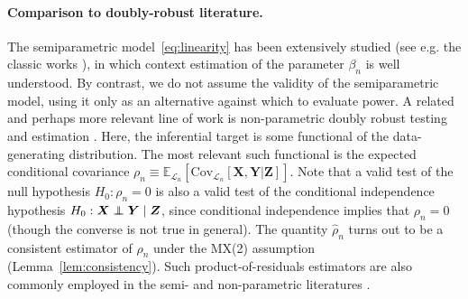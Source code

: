 \documentclass[12pt]{article}
\theoremstyle{definition}
\theoremstyle{remark}
\def\independenT#1#2{\mathrel{\rlap{$#1#2$}\mkern2mu{#1#2}}}
\newcommand\independent{\protect\mathpalette{\protect\independenT}{\perp}}
\newcommand{\prx}{\bm X}
\newcommand{\prz}{\bm Z}
\newcommand{\pry}{{\bm Y}}
\begin{document}

\paragraph{Comparison to doubly-robust literature.}

The semiparametric model~\eqref{eq:linearity} has been extensively studied (see e.g. the classic works \cite{Robinson1988, Robins1992}), in which context estimation of the parameter $\beta_n$ is well understood. By contrast, we do not assume the validity of the semiparametric model, using it only as an alternative against which to evaluate power. A related and perhaps more relevant line of work is non-parametric doubly robust testing \cite{Shah2018, Dukes2020}  and estimation \cite{VanderLaan2011, Chernozhukov2018}. Here, the inferential target is some functional of the data-generating distribution. The most relevant such functional is the expected conditional covariance $\rho_n \equiv \mathbb E_{\mathcal L_n}[\text{Cov}_{\mathcal L_n}[\prx, \pry|\prz]]$. Note that a valid test of the null hypothesis $H_0: \rho_n = 0$ is also a valid test of the conditional independence hypothesis $H_0: \prx \independent \pry \mid \prz$, since conditional independence implies that $\rho_n = 0$ (though the converse is not true in general). The quantity $\widehat \rho_n$ turns out to be a consistent estimator of $\rho_n$ under the MX(2) assumption (Lemma~\ref{lem:consistency}). Such product-of-residuals estimators are also commonly employed in the semi- and non-parametric literatures \cite{Robinson1988, Robins1992, Li2011}.
\end{document}
